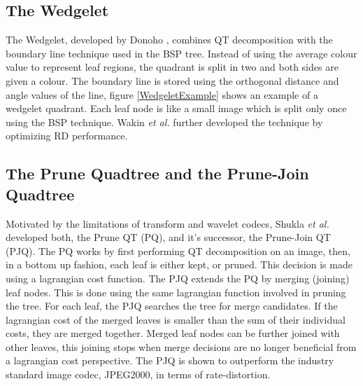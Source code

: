 \subsection{The Wedgelet}

The Wedgelet, developed by Donoho \cite{Donoho99Wedgelets}, combines QT decomposition with the boundary line technique used in the BSP tree. Instead of using the average colour value to represent leaf regions, the quadrant is split in two and both sides are given a colour. The boundary line is stored using the orthogonal distance and angle values of the line, figure \ref{WedgeletExample} shows an example of a wedgelet quadrant. Each leaf node is like a small image which is split only once using the BSP technique. Wakin \textit{et al.} \cite{Wakin02Rate} further developed the technique by optimizing RD performance.


\subsection{The Prune Quadtree and the Prune-Join Quadtree}

Motivated by the limitations of transform and wavelet codecs, Shukla \textit{et al.} \cite{Shukla05Rate} developed both, the Prune QT (PQ), and it's successor, the Prune-Join QT (PJQ). The PQ works by first performing QT decomposition on an image, then, in a bottom up fashion, each leaf is either kept, or pruned. This decision  is made using a lagrangian cost function. The PJQ extends the PQ by merging (joining) leaf nodes. This is done using the same lagrangian function involved in pruning the tree. For each leaf, the PJQ searches the tree for merge candidates. If the lagrangian cost of the merged leaves is smaller than the sum of their individual costs, they are merged together. Merged leaf nodes can be further joined with other leaves, this joining stops when merge decisions are no longer beneficial from a lagrangian cost perspective. The PJQ is shown to outperform the industry standard image codec, JPEG2000, in terms of rate-distortion.

